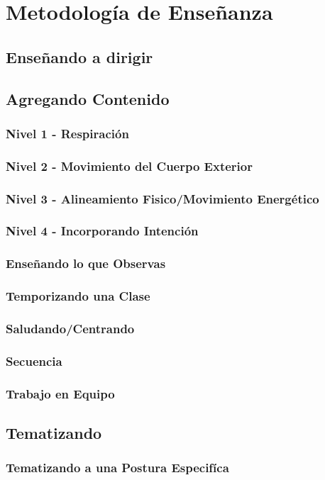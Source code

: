 \documentclass[a4paper]{article}
\begin{document}
\section{Metodología de Enseñanza}
\subsection{Enseñando a dirigir}
\subsection{Agregando Contenido}
\subsubsection{Nivel 1 - Respiración}
\subsubsection{Nivel 2 - Movimiento del Cuerpo Exterior}
\subsubsection{Nivel 3 - Alineamiento Fisico/Movimiento Energético}
\subsubsection{Nivel 4 - Incorporando Intención}
\subsubsection{Enseñando lo que Observas}
\subsubsection{Temporizando una Clase}
\subsubsection{Saludando/Centrando}
\subsubsection{Secuencia}
\subsubsection{Trabajo en Equipo}
\subsection{Tematizando}
\subsubsection{Tematizando a una Postura Especifíca}
\end{document}
